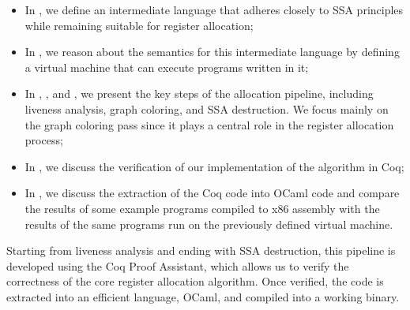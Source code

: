 \begin{itemize}
\item In , we define an intermediate language that adheres closely to SSA principles while remaining suitable for register allocation;
\item In , we reason about the semantics for this intermediate language by defining a virtual machine that can execute programs written in it;
\item In , , and , we present the key steps of the allocation pipeline, including liveness analysis, graph coloring, and SSA destruction. We focus mainly on the graph coloring pass since it plays a central role in the register allocation process;
\item In , we discuss the verification of our implementation of the algorithm in Coq;
\item In , we discuss the extraction of the Coq code into OCaml code and compare the results of some example programs compiled to x86 assembly with the results of the same programs run on the previously defined virtual machine.
\end{itemize}

Starting from liveness analysis and ending with SSA destruction, this pipeline is developed using the Coq Proof Assistant, which allows us to verify the correctness of the core register allocation algorithm. Once verified, the code is extracted into an efficient language, OCaml, and compiled into a working binary.